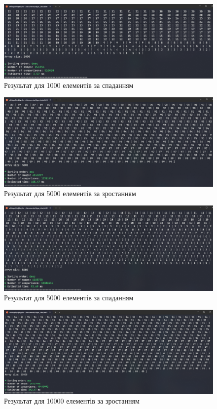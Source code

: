 \begin{figure}[h!]
  \centering
  \includegraphics[width=13cm]{reports/algos/lab11/assets/1000d.png}
  \caption{Результат для 1000 елементів за спаданням}
\end{figure}

\begin{figure}[h!]
  \centering
  \includegraphics[width=13cm]{reports/algos/lab11/assets/5000a.png}
  \caption{Результат для 5000 елементів за зростанням}
\end{figure}

\begin{figure}[h!]
  \centering
  \includegraphics[width=13cm]{reports/algos/lab11/assets/5000d.png}
  \caption{Результат для 5000 елементів за спаданням}
\end{figure}

\begin{figure}[h!]
  \centering
  \includegraphics[width=13cm]{reports/algos/lab11/assets/10000a.png}
  \caption{Результат для 10000 елементів за зростанням}
\end{figure}


